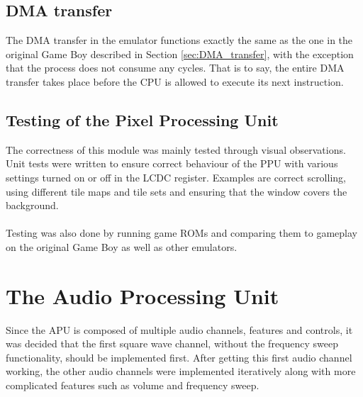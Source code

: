 \subsection{DMA transfer}
\label{sec:DMA_transfer_result}
The DMA transfer in the emulator functions exactly the same as the one in the original Game Boy described in Section \ref{sec:DMA_transfer}, with the exception that the process does not consume any cycles. That is to say, the entire DMA transfer takes place before the CPU is allowed to execute its next instruction.

\subsection{Testing of the Pixel Processing Unit}
The correctness of this module was mainly tested through visual observations. Unit tests were written to ensure correct behaviour of the PPU with various settings turned on or off in the LCDC register. Examples are correct scrolling, using different tile maps and tile sets and ensuring that the window covers the background.\\
\\
Testing was also done by running game ROMs and comparing them to gameplay on the original Game Boy as well as other emulators.
\newpage
\section{The Audio Processing Unit}

Since the APU is composed of multiple audio channels, features and controls, it was decided that the first square wave channel, without the frequency sweep functionality, should be implemented first. After getting this first audio channel working, the other audio channels were implemented iteratively along with more complicated features such as volume and frequency sweep.

